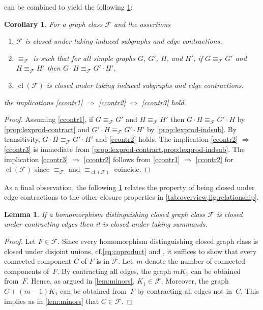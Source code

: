 \documentclass[3p,final]{elsarticle}
\DeclareMathOperator{\cl}{cl}
\newtheorem{lemma}[theorem]{Lemma}
\newtheorem{corollary}[theorem]{Corollary}
\begin{document}
	 can be combined to yield the following \cref{cor:lexprod}:
	
	\begin{corollary} \label{cor:lexprod}
		For a graph class $\mathcal{F}$ and the assertions
		\begin{enumerate}
			\item $\mathcal{F}$ is closed under taking induced subgraphs and edge contractions,\label{ccontr1}
			\item $\equiv_{\mathcal{F}}$ is such that for all simple  graphs $G$, $G'$, $H$, and $H'$, if $G \equiv_{\mathcal{F}} G'$ and $H \equiv_{\mathcal{F}} H'$ then $G \cdot H \equiv_{\mathcal{F}} G' \cdot H'$,\label{ccontr2}
			\item $\cl(\mathcal{F})$ is closed under taking induced subgraphs and edge contractions.\label{ccontr3}
		\end{enumerate}
		the implications \ref{ccontr1} $\Rightarrow$ \ref{ccontr2} $\Leftrightarrow$ \ref{ccontr3}  hold.
	\end{corollary}
	\begin{proof}%
		Assuming \ref{ccontr1}, if $G \equiv_{\mathcal{F}} G'$ and $H \equiv_{\mathcal{F}} H'$ then $G \cdot H \equiv_{\mathcal{F}} G' \cdot H$ by \cref{prop:lexprod-contract}
		and $G' \cdot H \equiv_{\mathcal{F}} G' \cdot H'$ by \cref{prop:lexprod-indsub}.
		By transitivity, $G \cdot H \equiv_{\mathcal{F}} G' \cdot H'$ and \ref{ccontr2} holds. The implication \ref{ccontr2} $\Rightarrow$ \ref{ccontr3} is immediate from \cref{prop:lexprod-contract,prop:lexprod-indsub}.
		The implication \ref{ccontr3} $\Rightarrow$ \ref{ccontr2} follows from \ref{ccontr1} $\Rightarrow$ \ref{ccontr2} for $\cl(\mathcal{F})$ since $\equiv_{\mathcal{F}}$ and $\equiv_{\cl(\mathcal{F})}$ coincide.  
	\end{proof}
	
	
	As a final observation, the following \cref{lem:contr} relates the property of being closed under edge contractions to the other closure properties in \cref{tab:overview,fig:relationship}.

	\begin{lemma} \label{lem:contr}
		If a homomorphism distinguishing closed graph class $\mathcal{F}$ is closed under contracting edges then it is closed under taking summands.
	\end{lemma}
	\begin{proof}%
		Let $F \in \mathcal{F}$. Since every homomorphism distinguishing closed graph class is closed under disjoint unions, cf.\@ \cref{eq:coproduct} and \cite{roberson_oddomorphisms_2022}, it suffices to show that every connected component $C$ of $F$ is in $\mathcal{F}$. Let~$m$ denote the number of connected components of~$F$. 
		By contracting all edges, the graph $mK_1$ can be obtained from~$F$.
		Hence, as argued in \cref{lem:minors}, $K_1 \in \mathcal{F}$. 
		Moreover, the graph $C + (m-1)K_1$ can be obtained from~$F$ by contracting all edges not in~$C$. This implies as in \cref{lem:minors} that $C \in \mathcal{F}$.
	\end{proof}
\end{document}
